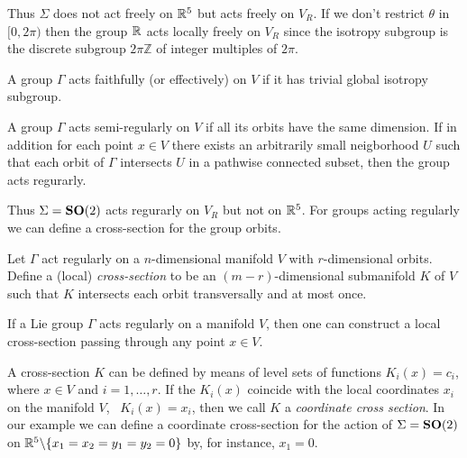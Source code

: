 Thus $\Sigma$ does not act freely on $\mathbb{R}^{5}$ but acts freely on $V_R$. If we don't
restrict $\theta$ in $[0,2\pi)$ then the group $\mathbb{R}^{}$ acts locally freely on $V_R$
since the isotropy subgroup is the discrete subgroup $2\pi\mathbb{Z}$ of integer multiples of $2\pi$.

\begin{definition}
\label{def:faithfull}
A group $\Gamma$ acts faithfully (or effectively) on $V$ if it has trivial global isotropy subgroup.
\end{definition}

\begin{definition}
\label{def:regular}
A group $\Gamma$ acts semi-regularly on $V$ if all its orbits have the same dimension. If in addition for each point $x\in V$
there exists an arbitrarily small neigborhood $U$ such that each orbit of $\Gamma$ intersects $U$ in a pathwise connected subset, then the group
acts regurarly.
\end{definition}

Thus $\Sigma=\mathbf{SO}(2)$ acts regurarly on $V_R$ but not on $\mathbb{R}^{5}$. For groups acting regularly we can define a cross-section for the group orbits.

\begin{definition}
\label{def:cross-section}
Let $\Gamma$ act regularly on a $n$-dimensional manifold $V$ with $r$-dimensional orbits. Define a (local) \emph{cross-section}
to be an $(m-r)$-dimensional submanifold $K$ of $V$ such that $K$ intersects each orbit transversally and at most once.
\end{definition}

\begin{proposition}
 If a Lie group $\Gamma$ acts regularly on a manifold $V$, then one can construct a local cross-section
 passing through any point $x\in V$.
\end{proposition}

A cross-section $K$ can be defined by means of level sets of functions $K_i(x)=c_i$, where $x\in V$ and $i=1,\ldots,r$. If the $K_i(x)$
coincide with the local coordinates $x_i$ on the manifold $V$, \ie~$K_i(x)=x_i$, then we call $K$ a \emph{coordinate cross
section}. In our example we can define a coordinate cross-section for the action of $\Sigma=\mathbf{SO}(2)$ on $\mathbb{R}^{5}\backslash\{x_1=x_2=y_1=y_2=0\}$  by, for instance, $x_1=0$.

